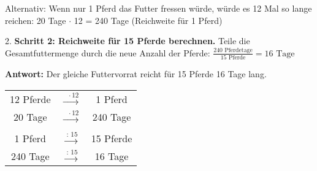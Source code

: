 \begin{loesungsumgebung}[loes:2.3]{}
    Alternativ: Wenn nur 1 Pferd das Futter fressen würde, würde es 12 Mal so lange reichen:
    20 Tage $\cdot$ 12 = 240 Tage (Reichweite für 1 Pferd)

2.  \textbf{Schritt 2: Reichweite für 15 Pferde berechnen.}
    Teile die Gesamtfuttermenge durch die neue Anzahl der Pferde:
    $\frac{240 \text{ Pferdetage}}{15 \text{ Pferde}} = 16 \text{ Tage}$

\textbf{Antwort:} Der gleiche Futtervorrat reicht für 15 Pferde 16 Tage lang.

\begin{center}
\begin{tabular}{c c c}
    12 Pferde & $\xrightarrow{\text{ } \cdot 12}$ & 1 Pferd \\
    20 Tage & $\xrightarrow{\text{ } \cdot 12}$ & 240 Tage \\
    \quad \\
    1 Pferd & $\xrightarrow{\text{ : } 15}$ & 15 Pferde \\
    240 Tage & $\xrightarrow{\text{ : } 15}$ & 16 Tage \\
\end{tabular}
\end{center}
\end{loesungsumgebung}